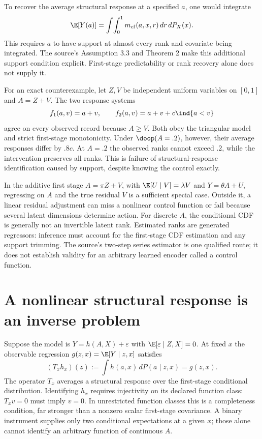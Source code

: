 To recover the average structural response at a specified $a$, one
would integrate
\begin{equation}
 \E[Y(a)]=\int\!\int_0^1m_{\rm cf}(a,x,r)\,dr\,dP_X(x).
 \label{r3:control-average}
\end{equation}
This requires $a$ to have support at almost every rank and covariate
being integrated. The source's Assumption 3.3 and Theorem 2 make this
additional support condition explicit. First-stage predictability
or rank recovery alone does not supply it.

For an exact counterexample, let $Z,V$ be independent uniform
variables on $[0,1]$ and $A=Z+V$. The two response systems
\[
 f_1(a,v)=a+v,\qquad
 f_2(a,v)=a+v+c\ind\{a<v\}
\]
agree on every observed record because $A\ge V$. Both obey the
triangular model and strict first-stage monotonicity. Under
$\doop(A=.2)$, however, their average responses differ by $.8c$.
At $A=.2$ the observed ranks cannot exceed $.2$, while the intervention
preserves all ranks. This is failure of structural-response
identification caused by support, despite knowing the control exactly.

In the additive first stage $A=\pi Z+V$, with
$\E[U\mid V]=\lambda V$ and $Y=\theta A+U$, regressing on
$A$ and the true residual $V$ is a sufficient special case. Outside
it, a linear residual adjustment can miss a nonlinear control
function or fail because several latent dimensions determine action.
For discrete $A$, the conditional CDF is generally not an invertible
latent rank. Estimated ranks are generated regressors: inference must
account for the first-stage CDF estimation and any support trimming.
The source's two-step series estimator is one qualified route; it
does not establish validity for an arbitrary learned encoder called
a control function.

\section{A nonlinear structural response is an inverse problem}
\label{r3:inverse-introduction}
Suppose the model is $Y=h(A,X)+\varepsilon$ with
$\E[\varepsilon\mid Z,X]=0$. At fixed $x$ the observable regression
$g(z,x)=\E[Y\mid z,x]$ satisfies
\begin{equation}
 (T_xh_x)(z):=\int h(a,x)\,dP(a\mid z,x)=g(z,x).
 \label{r3:npiv-operator}
\end{equation}
The operator $T_x$ averages a structural response over the first-stage
conditional distribution. Identifying $h_x$ requires injectivity on its
declared function class: $T_xv=0$ must imply $v=0$. In unrestricted
function classes this is a completeness condition, far stronger than a
nonzero scalar first-stage covariance. A binary instrument supplies only
two conditional expectations at a given $x$; those alone cannot identify
an arbitrary function of continuous $A$.

